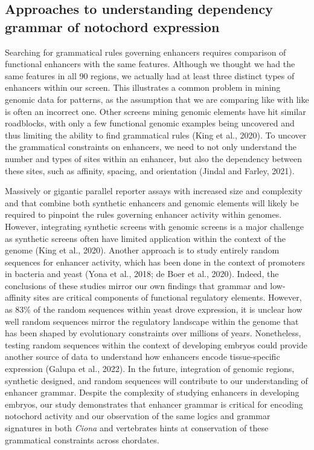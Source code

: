 \subsection{Approaches to understanding dependency grammar of notochord expression}

Searching for grammatical rules governing enhancers requires comparison of functional enhancers with the same features. Although we thought we had the same features in all 90 regions, we actually had at least three distinct types of enhancers within our screen. This illustrates a common problem in mining genomic data for patterns, as the assumption that we are comparing like with like is often an incorrect one. Other screens mining genomic elements have hit similar roadblocks, with only a few functional genomic examples being uncovered and thus limiting the ability to find grammatical rules (King et al., 2020).  To uncover the grammatical constraints on enhancers, we need to not only understand the number and types of sites within an enhancer, but also the dependency between these sites, such as affinity, spacing, and orientation (Jindal and Farley, 2021). 

Massively or gigantic parallel reporter assays with increased size and complexity and that combine both synthetic enhancers and genomic elements will likely be required to pinpoint the rules governing enhancer activity within genomes. However, integrating synthetic screens with genomic screens is a major challenge as synthetic screens often have limited application within the context of the genome (King et al., 2020). Another approach is to study entirely random sequences for enhancer activity, which has been done in the context of promoters in bacteria and yeast (Yona et al., 2018; de Boer et al., 2020). Indeed, the conclusions of these studies mirror our own findings that grammar and low-affinity sites are critical components of functional regulatory elements. However, as 83\% of the random sequences within yeast drove expression, it is unclear how well random sequences mirror the regulatory landscape within the genome that has been shaped by evolutionary constraints over millions of years. Nonetheless, testing random sequences within the context of developing embryos could provide another source of data to understand how enhancers encode tissue-specific expression (Galupa et al., 2022). In the future, integration of genomic regions, synthetic designed, and random sequences will contribute to our understanding of enhancer grammar. Despite the complexity of studying enhancers in developing embryos, our study demonstrates that enhancer grammar is critical for encoding notochord activity and our observation of the same logics and grammar signatures in both \textit{Ciona} and vertebrates hints at conservation of these grammatical constraints across chordates. 


